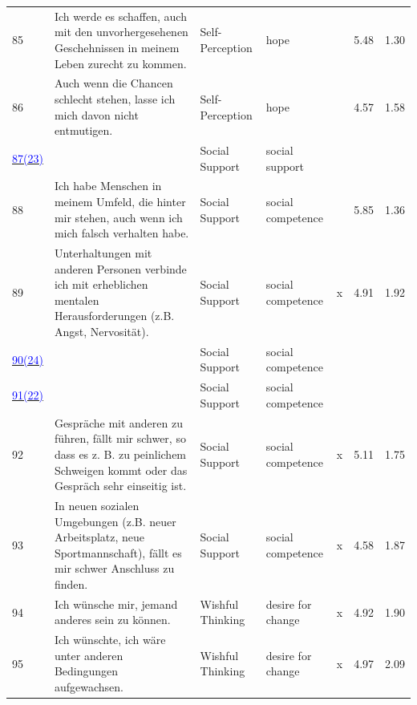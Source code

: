 \documentclass[
  man,floatsintext]{apa7}
\begin{document}
\begin{center}
\begin{ThreePartTable}
{\begin{longtable}{m{0.6cm}m{7.3cm}m{2.2cm}m{2.2cm}m{0.2cm}m{0.4cm}m{0.4cm}}
85 & Ich werde es schaffen, auch mit den unvorhergesehenen Geschehnissen in meinem Leben zurecht zu kommen. & Self-Perception & hope &  & 5.48 & 1.30\\
86 & Auch wenn die Chancen schlecht stehen, lasse ich mich davon nicht entmutigen. & Self-Perception & hope &  & 4.57 & 1.58\\
\label{sozia_1_038}\hyperref[table1]{\textcolor{blue}{87(23)}} & \cellcolor{lightgray}{Mir ist wichtig, dass ich mich mit Freunden austauschen kann, wenn ich mich unwohl fühle oder Schmerzen habe.} & Social Support & social support & \cellcolor{lightgray}{\ } & \cellcolor{lightgray}{5.49} & \cellcolor{lightgray}{1.59}\\
88 & Ich habe Menschen in meinem Umfeld, die hinter mir stehen, auch wenn ich mich falsch verhalten habe. & Social Support & social competence &  & 5.85 & 1.36\\
89 & Unterhaltungen mit anderen Personen verbinde ich mit erheblichen mentalen Herausforderungen (z.B. Angst, Nervosität). & Social Support & social competence & x & 4.91 & 1.92\\
\label{sozia_1_354}\hyperref[table1]{\textcolor{blue}{90(24)}} & \cellcolor{lightgray}{In meinem Freundeskreis bringen wir uns gegenseitig zum Lachen, auch in schwierigen Situationen.} & Social Support & social competence & \cellcolor{lightgray}{\ } & \cellcolor{lightgray}{5.71} & \cellcolor{lightgray}{1.44}\\
\label{sozia_1_355}\hyperref[table1]{\textcolor{blue}{91(22)}} & \cellcolor{lightgray}{Ich genieße es, meine Zeit mit anderen Menschen zu verbringen.} & Social Support & social competence & \cellcolor{lightgray}{\ } & \cellcolor{lightgray}{5.42} & \cellcolor{lightgray}{1.52}\\
92 & Gespräche mit anderen zu führen, fällt mir schwer, so dass es z. B. zu peinlichem Schweigen kommt oder das Gespräch sehr einseitig ist. & Social Support & social competence & x & 5.11 & 1.75\\
93 & In neuen sozialen Umgebungen (z.B. neuer Arbeitsplatz, neue Sportmannschaft), fällt es mir schwer Anschluss zu finden. & Social Support & social competence & x & 4.58 & 1.87\\
94 & Ich wünsche mir, jemand anderes sein zu können. & Wishful Thinking & desire for change & x & 4.92 & 1.90\\
95 & Ich wünschte, ich wäre unter anderen Bedingungen aufgewachsen. & Wishful Thinking & desire for change & x & 4.97 & 2.09\\

\end{longtable}}
\end{ThreePartTable}
\end{center}
\end{document}

